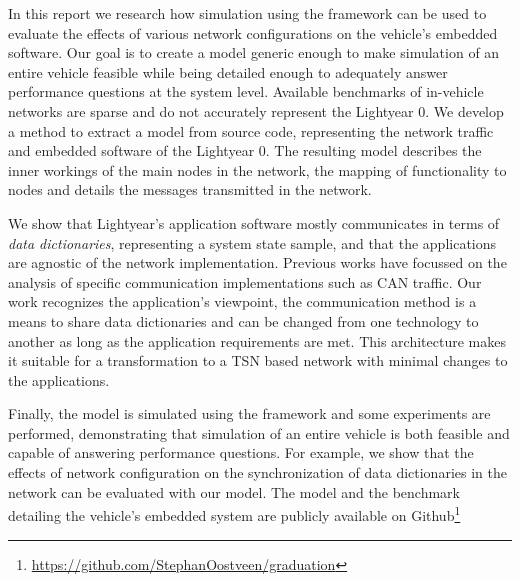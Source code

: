 In this report we research how simulation using the \omnet framework can be used to evaluate the effects of various network configurations on the vehicle's embedded software. Our goal is to create a model generic enough to make simulation of an entire vehicle feasible while being detailed enough to adequately answer performance questions at the system level. Available benchmarks of in-vehicle networks are sparse and do not accurately represent the Lightyear 0. We develop a method to extract a model from source code, representing the network traffic and embedded software of the Lightyear 0. The resulting model describes the inner workings of the main nodes in the network, the mapping of functionality to nodes and details the messages transmitted in the network. 

We show that Lightyear's application software mostly communicates in terms of \textit{data dictionaries}, representing a system state sample, and that the applications are agnostic of the network implementation. Previous works have focussed on the analysis of specific communication implementations such as CAN traffic. Our work recognizes the application's viewpoint, the communication method is a means to share data dictionaries and can be changed from one technology to another as long as the application requirements are met. This architecture makes it suitable for a transformation to a TSN based network with minimal changes to the applications. 

Finally, the model is simulated using the \omnet framework and some experiments are performed, demonstrating that simulation of an entire vehicle is both feasible and capable of answering performance questions. For example, we show that the effects of network configuration on the synchronization of data dictionaries in the network can be evaluated with our model. The \omnet model and the benchmark detailing the vehicle's embedded system are publicly available on Github\footnote{\url{https://github.com/StephanOostveen/graduation}}


